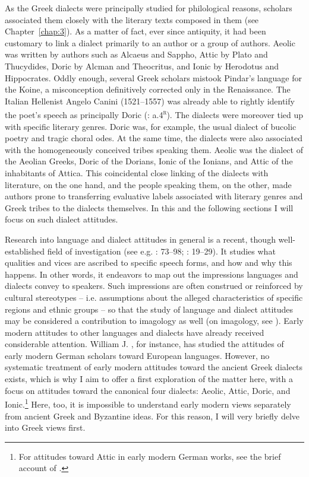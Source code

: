 As the Greek dialects were principally studied for philological reasons, scholars associated them closely with the literary texts composed in them (see Chapter~\ref{chap:3}). As a matter of fact, ever since antiquity, it had been customary to link a dialect primarily to an author or a group of authors. Aeolic was written by authors such as Alcaeus and Sappho, Attic by Plato and Thucydides, Doric by Alcman and Theocritus, and Ionic by Herodotus and Hippocrates. Oddly enough, several Greek scholars mistook Pindar’s language for the Koine, a misconception definitively corrected only in the Renaissance. The Italian Hellenist Angelo Canini (1521–1557) was already able to rightly identify the poet’s speech as principally Doric (\citealt{Canini1555}: a.4\textsc{\textsuperscript{r}}). The dialects were moreover tied up with specific literary genres. Doric was, for example, the usual dialect of bucolic poetry and tragic choral odes. At the same time, the dialects were also associated with the homogeneously conceived tribes speaking them. Aeolic was the dialect of the Aeolian Greeks, Doric of the Dorians, Ionic of the Ionians, and Attic of the inhabitants of Attica. This coincidental close linking of the dialects with literature, on the one hand, and the people speaking them, on the other, made authors prone to transferring evaluative labels associated with literary genres and Greek tribes to the dialects themselves. In this and the following sections I will focus on such dialect attitudes.

Research into language and dialect attitudes in general is a recent, though well-established field of investigation (see e.g. \citealt{Edwards2009}: 73–98; \citealt{Garrett2010}: 19–29). It studies what qualities and vices are ascribed to specific speech forms, and how and why this happens. In other words, it endeavors to map out the impressions languages and dialects convey to speakers. Such impressions are often construed or reinforced by cultural stereotypes – i.e. assumptions about the alleged characteristics of specific regions and ethnic groups – so that the study of language and dialect attitudes may be considered a contribution to imagology as well (on imagology, see \citealt{BellerLeerssen2007}). Early modern attitudes to other languages and dialects have already received considerable attention. William J. \citet{Jones1999}, for instance, has studied the attitudes of early modern German scholars toward European languages. However, no systematic treatment of early modern attitudes toward the ancient Greek dialects exists, which is why I aim to offer a first exploration of the matter here, with a focus on attitudes toward the canonical four dialects: Aeolic, Attic, Doric, and Ionic.\footnote{For attitudes toward Attic in early modern German works, see the brief account of \citet[251--252]{Roelcke2014}.} Here, too, it is impossible to understand early modern views separately from ancient Greek and Byzantine ideas. For this reason, I will very briefly delve into Greek views first.

